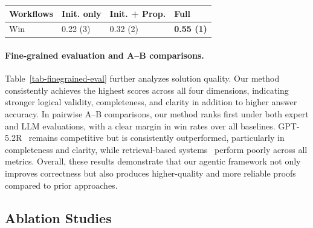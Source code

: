 \documentclass{article}
\begin{document}
\begin{table}[t!]
\begin{minipage}{0.48\textwidth}
\begin{tabular}{x{40pt}| x{34pt} x{60pt} x{34pt}}
    \bottomrule
    \end{tabular}
\end{minipage}
\hspace{1.5mm}
\begin{minipage}{0.48\textwidth}
    \centering
    \label{tab:ablation-workflow}
    \vspace{-2mm}
    \begin{tabular}{x{42pt}| x{34pt} x{50pt} x{34pt}}\toprule
    Workflows 
    & Init. only 
    & Init. + Prop. 
    &  Full \\\midrule
    Win 
    & 0.22 (3) 
    & 0.32 (2) 
    &  \textbf{0.55 (1)} \\
    \bottomrule
    \end{tabular}
\end{minipage}
\vspace{-20pt}
\end{table}

\vspace{-7pt}
\paragraph{Fine-grained evaluation and A--B comparisons.}
Table~\ref{tab-finegrained-eval} further analyzes solution quality. Our method consistently achieves the highest scores across all four dimensions, indicating stronger logical validity, completeness, and clarity in addition to higher answer accuracy. In pairwise A--B comparisons, our method ranks first under both expert and LLM evaluations, with a clear margin in win rates over all baselines. GPT-5.2R~\citep{openai_first_proof_2025} remains competitive but is consistently outperformed, particularly in completeness and clarity, while retrieval-based systems~\citep{google_gemini_deep_research_2025,openai_deep_research_2025} perform poorly across all metrics. Overall, these results demonstrate that our agentic framework not only improves correctness but also produces higher-quality and more reliable proofs compared to prior approaches.

\vspace{-7pt}
\subsection{Ablation Studies}
\vspace{-7pt}
\label{sec-ablation}
\end{document}
